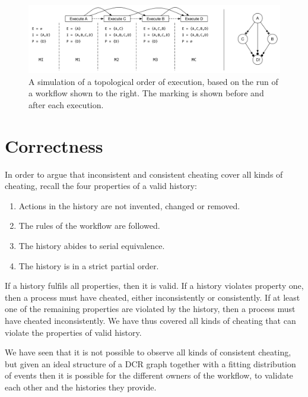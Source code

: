 	\begin{figure}[H]
		\centering
		\includegraphics[width=\textwidth]{6validation/images/simulation.pdf}
		\caption{A simulation of a topological order of execution, based on the run of a workflow shown to the right. The marking is shown before and after each execution.}
		\label{fig:validation:simulation}
	\end{figure}
    
    \section{Correctness}
    In order to argue that inconsistent and consistent cheating cover all kinds of cheating, recall the four properties of a valid history:
    
    \begin{enumerate}
       	\item Actions in the history are not invented, changed or removed.
       	\item The rules of the workflow are followed.
       	\item The history abides to serial equivalence.
       	\item The history is in a strict partial order.
    \end{enumerate}
    
    \noindent If a history fulfils all properties, then it is valid. If a history violates property one, then a process must have cheated, either inconsistently or consistently. If at least one of the remaining properties are violated by the history, then a process must have cheated inconsistently. We have thus covered all kinds of cheating that can violate the properties of valid history.
    
    \newpar We have seen that it is not possible to observe all kinds of consistent cheating, but given an ideal structure of a DCR graph together with a fitting distribution of events then it is possible for the different owners of the workflow, to validate each other and the histories they provide.